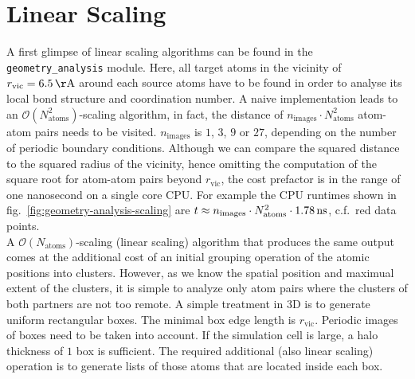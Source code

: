 \documentclass[oribibl]{llncs}
\newcommand{\um}[1]{_{\mathrm{#1}}}
\newcommand{\ttt}[1]{\texttt{#1}}
\begin{document}
\section{Linear Scaling} \label{sec:linear-scaling}
%
A first glimpse of linear scaling algorithms can be found in the
\ttt{geometry\_analysis} module.
Here, all target atoms in the vicinity of $r\um{vic} = \unit[6.5]{\AA}$ around each source atoms
have to be found in order to analyse its local bond structure and coordination number.
A naive implementation leads to an $\mathcal O(N\um{atoms}^2)$-scaling algorithm,
in fact, the distance of $n\um{images} \cdot N\um{atoms}^2$ atom-atom pairs
needs to be visited.
$n\um{images}$ is $1$, $3$, $9$ or $27$, depending on the number of periodic boundary conditions.
Although we can compare the squared distance to the squared radius of the vicinity,
hence omitting the computation of the square root for atom-atom pairs beyond $r\um{vic}$,
the cost prefactor is in the range of one nanosecond on a single core CPU.
For example the CPU runtimes shown in fig.~\ref{fig:geometry-analysis-scaling}
are $t \approx n\um{images} \cdot N\um{atoms}^2 \cdot \unit[1.78]{ns}$, c.f.~red data points.
\\
A $\mathcal O(N\um{atoms})$-scaling (linear scaling) algorithm that produces the same output comes at the additional
cost of an initial grouping operation of the atomic positions into clusters.
However, as we know the spatial position and maximual extent of the clusters,
it is simple to analyze only atom pairs where the clusters of both partners
are not too remote.
A simple treatment in 3D is to generate uniform rectangular boxes. 
The minimal box edge length is $r\um{vic}$.
Periodic images of boxes need to be taken into account.
If the simulation cell is large, a halo thickness of $1$ box is sufficient.
The required additional (also linear scaling) operation is to generate lists of those atoms
that are located inside each box.
%
% 
\end{document}
